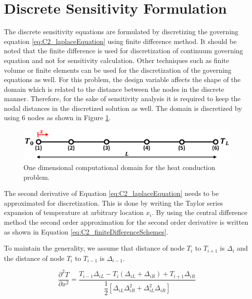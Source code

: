 \section{Discrete Sensitivity Formulation}
The discrete sensitivity equations are formulated by discretizing the governing equation \eqref{eq:C2_laplaceEquation} using finite difference method. It should be noted that the finite difference is used for discretization of continuum governing equation and not for sensitivity calculation. Other techniques such as finite volume or finite elements can be used for the discretization of the governing equations as well. For this problem, the design variable affects the shape of the domain which is related to the distance between the nodes in the discrete manner. Therefore, for the sake of sensitivity analysis it is required to keep the nodal distances in the discretized solution as well. The domain is discretized by using 6 nodes as shown in Figure \ref{fig:C2_discretizedDomain}.

\begin{figure}[h]
	\centering
	\includegraphics[width=14.00cm]{Chapter_2/figure/benchmark_case_computational_domain.png}
	\caption{One dimensional computational domain for the heat conduction problem.}
	\label{fig:C2_discretizedDomain}
\end{figure}

The second derivative of Equation \eqref{eq:C2_laplaceEquation} needs to be approximated for discretization. This is done by writing the Taylor series expansion of temperature at arbitrary location $x_i$. By using the central difference method the second order approximation for the second order derivative is written as shown in Equation \eqref{eq:C2_finiteDifferenceSchemes}.

To maintain the generality, we assume that distance of node $T_i$ to $T_{i+1}$ is $\Delta_i$ and the distance of node $T_i$ to $T_{i-1}$ is $\Delta_{i-1}$.

\begin{equation}\label{eq:C2_finiteDifferenceSchemes}
	\frac{\partial^2 T}{\partial x^2} = 
	\frac{T_{i-1} \Delta_{iL} - 
	      T_{i} (\Delta_{iL} + \Delta_{iR}) + 
	      T_{i+1} \Delta_{iR}}
	     {\dfrac{1}{2} \left[ \Delta_{iL} \Delta_{iR}^2 + 
	                         \Delta_{iL}^2 \Delta_{iR} \right]}
\end{equation}

